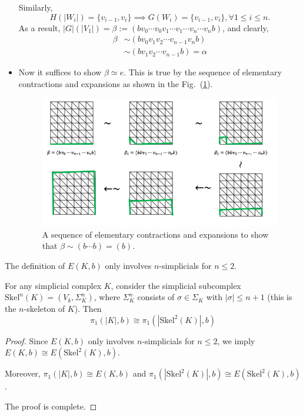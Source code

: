 \begin{itemize}
Similarly, 
\[
H(|W_i|)=\{v_{i-1},v_i\}\implies
G(W_i)=\{v_{i-1},v_i\}, \forall 1\le i\le n.
\]
As a result, $|G|(|V_1|)=\beta:=(bv_0\cdots v_0v_1\cdots v_1\cdots v_n\cdots v_nb)$, and clearly,
\begin{align*}
\beta&\sim(bv_0v_1v_2\cdots v_{n-1}v_nb)\\
&\sim(bv_1v_2\cdots v_{n-1}b)=\alpha
\end{align*}
\item
Now it suffices to show $\beta\simeq e$. This is true by the sequence of elementary contractions and expansions as shown in the Fig.~(\ref{fig:13:5}).
\begin{figure}[H]
\centering
\includegraphics[width=\textwidth]{week13/f_28}
\caption{A sequence of elementary contractions and expansions to show that $\beta\sim(b\cdots b)=(b)$.
} 
\label{fig:13:5}
\end{figure}


\end{itemize}




\begin{remark}
The definition of $E(K,b)$ only involves $n$-simplicials for $n\le 2$.
\end{remark}

\begin{proposition}
For any simplicial complex $K$, consider the simplicial subcomplex $\text{Skel}^n(K)=(V_k,\Sigma_K^n)$, 
where $\Sigma_K^n$ consists of $\sigma\in\Sigma_K$ with $|\sigma|\le n+1$ (this is the $n$-skeleton of $K$).
Then 
\[
\pi_1(|K|,b)\cong\pi_1(|\text{Skel}^2(K)|,b)
\]
\end{proposition}

\begin{proof}
Since $E(K,b)$ only involves $n$-simplicials for $n\le 2$, we imply $E(K,b)\cong E(\text{Skel}^2(K),b)$.

Moreover, $\pi_1(|K|,b)\cong E(K,b)$ and $\pi_1(|\text{Skel}^2(K)|,b)\cong E(\text{Skel}^2(K),b)$.

The proof is complete.
\end{proof}




